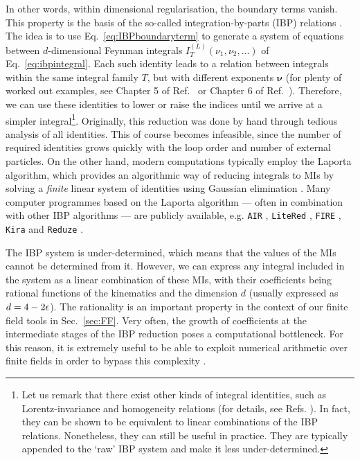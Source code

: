 \documentclass[main.tex]{subfiles}
\begin{document}
In other words, within dimensional regularisation, the boundary terms vanish. This property is the basis of the so-called integration-by-parts (IBP) relations \cite{Chetyrkin:1981qh}. The idea is to use Eq.~\ref{eq:IBPboundaryterm} to generate a system of equations between $d$-dimensional Feynman integrals $I_T^{(L)}(\nu_1, \nu_2, \ldots)$ of Eq.~\ref{eq:ibpintegral}. Each such identity leads to a relation between integrals within the same integral family $T$, but with different exponents $\bm{\nu}$ (for plenty of worked out examples, see Chapter 5 of Ref.~\cite{smirnov2006feynman} or Chapter 6 of Ref.~\cite{Weinzierl:2022eaz}). Therefore, we can use these identities to lower or raise the indices until we arrive at a simpler integral\footnote{Let us remark that there exist other kinds of integral identities, such as Lorentz-invariance and homogeneity relations (for details, see Refs. \cite{grozin:2011mt, Lee:2008tj, Lee:2012cn}). In fact, they can be shown to be equivalent to linear combinations of the IBP relations. Nonetheless, they can still be useful in practice. They are typically appended to the `raw' IBP system and make it less under-determined.}. Originally, this reduction was done by hand through tedious analysis of all identities. This of course becomes infeasible, since the number of required identities grows quickly with the loop order and number of external particles. On the other hand, modern computations typically employ the Laporta algorithm, which provides an algorithmic way of reducing integrals to MIs by solving a \textit{finite} linear system of identities using Gaussian elimination \cite{Laporta:2001dd}. Many computer programmes based on the Laporta algorithm --- often in combination with other IBP algorithms --- are publicly available, e.g. \texttt{AIR} \cite{Anastasiou:2004vj}, \texttt{LiteRed} \cite{Lee:2012cn, Lee:2013mka}, \texttt{FIRE} \cite{Smirnov:2008iw, Smirnov:2019qkx}, \texttt{Kira} \cite{Maierhofer:2017gsa, Klappert:2020nbg} and \texttt{Reduze} \cite{Studerus:2009ye, vonManteuffel:2012np}.

The IBP system is under-determined, which means that the values of the MIs cannot be determined from it. However, we can express any integral included in the system as a linear combination of these MIs, with their coefficients being rational functions of the kinematics and the dimension $d$ (usually expressed as $d=4-2\epsilon$). The rationality is an important property in the context of our finite field tools in Sec.~\ref{sec:FF}. Very often, the growth of coefficients at the intermediate stages of the IBP reduction poses a computational bottleneck. For this reason, it is extremely useful to be able to exploit numerical arithmetic over finite fields in order to bypass this complexity \cite{Peraro:2019svx}.
\end{document}
